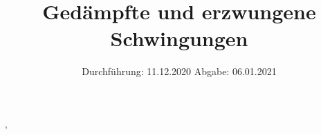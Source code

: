 

\subject{Versuch Nr. 354}
\title{Gedämpfte und erzwungene Schwingungen}
\date{%
  Durchführung: 11.12.2020
  \hspace{3em}
  Abgabe: 06.01.2021
}



\maketitle
\thispagestyle{empty}
\tableofcontents
\newpage





‚

\nocite{*}
\printbibliography{}

